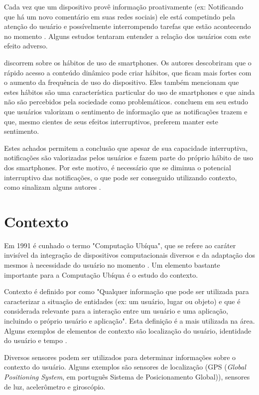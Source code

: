 Cada vez que um dispositivo provê informação proativamente (ex: Notificando que há um novo comentário em suas redes
sociais) ele está competindo pela atenção do usuário e possívelmente interrompendo tarefas que estão acontecendo no momento
\cite{ho2005using}. Alguns estudos tentaram entender a relação dos usuários com este efeito adverso.

 discorrem sobre os hábitos de uso de smartphones. Os autores descobriram que o rápido acesso a
conteúdo dinâmico pode criar hábitos, que ficam mais fortes com o aumento da frequência de uso do dispositivo. Eles
também mencionam que estes hábitos são uma característica particular do uso de smartphones e que ainda não são percebidos
pela sociedade como problemáticos.  concluem em seu estudo que usuários valorizam o sentimento
de informação que as notificações trazem e que, mesmo cientes de seus efeitos interruptivos, preferem manter este sentimento.

Estes achados permitem a conclusão que apesar de sua capacidade interruptiva, notificações são valorizadas pelos
usuários e fazem parte do próprio hábito de uso dos smartphones. Por este motivo, é necessário que se diminua o potencial
interruptivo das notificações, o que pode ser conseguido utilizando contexto, como sinalizam alguns autores
\cite{ho2005using, kern2003context, iqbal2010notifications}.

\section{Contexto}
\label{contexto}

Em 1991 é cunhado o termo "Computação Ubíqua", que se refere ao caráter invisível da integração de dispositivos
computacionais diversos e da adaptação dos mesmos à necessidade do usuário no momento \cite{weiser1991computer}.
Um elemento bastante importante para a Computação Ubíqua é o estudo do contexto.

Contexto é definido por  como "Qualquer informação que pode ser utilizada para
caracterizar a situação de entidades (ex: um usuário, lugar ou objeto) e que é considerada relevante para
a interação entre um usuário e uma aplicação, incluindo o próprio usuário e aplicação". Esta definição é
a mais utilizada na área. Alguns exemplos de elementos de contexto são
localização do usuário, identidade do usuário e tempo \cite{ryan1999enhanced}.

Diversos sensores podem ser utilizados para determinar informações sobre o contexto do usuário. Alguns exemplos são
sensores de localização (GPS (\textit{Global Positioning System}, em português Sistema de Posicionamento Global)),
sensores de luz, acelerômetro e giroscópio.

